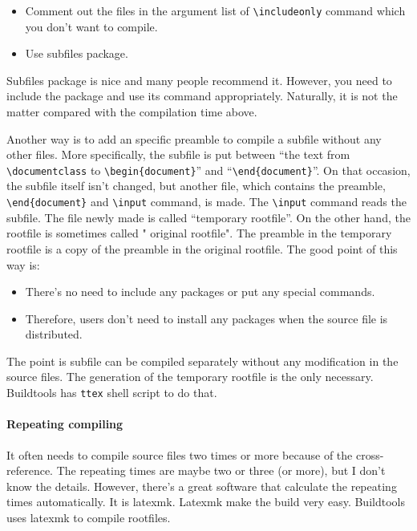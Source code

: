 \begin{itemize}
\tightlist
\item
  Comment out the files in the argument list of
  \texttt{\textbackslash{}includeonly} command which you don't want to
  compile.
\item
  Use subfiles package.
\end{itemize}

Subfiles package is nice and many people recommend it. However, you need
to include the package and use its command appropriately. Naturally, it
is not the matter compared with the compilation time above.

Another way is to add an specific preamble to compile a subfile without
any other files. More specifically, the subfile is put between ``the
text from \texttt{\textbackslash{}documentclass} to
\texttt{\textbackslash{}begin\{document\}}'' and
``\texttt{\textbackslash{}end\{document\}}''. On that occasion, the
subfile itself isn't changed, but another file, which contains the
preamble, \texttt{\textbackslash{}end\{document\}} and
\texttt{\textbackslash{}input} command, is made. The
\texttt{\textbackslash{}input} command reads the subfile. The file newly
made is called ``temporary rootfile''. On the other hand, the rootfile
is sometimes called " original rootfile". The preamble in the temporary
rootfile is a copy of the preamble in the original rootfile. The good
point of this way is:

\begin{itemize}
\tightlist
\item
  There's no need to include any packages or put any special commands.
\item
  Therefore, users don't need to install any packages when the source
  file is distributed.
\end{itemize}

The point is subfile can be compiled separately without any modification
in the source files. The generation of the temporary rootfile is the
only necessary. Buildtools has \texttt{ttex} shell script to do that.

\hypertarget{repeating-compiling}{%
\paragraph{Repeating compiling}\label{repeating-compiling}}

It often needs to compile source files two times or more because of the
cross-reference. The repeating times are maybe two or three (or more),
but I don't know the details. However, there's a great software that
calculate the repeating times automatically. It is latexmk. Latexmk make
the build very easy. Buildtools uses latexmk to compile rootfiles.

